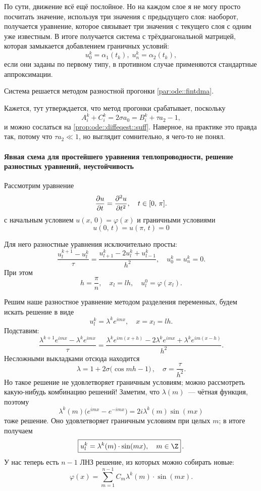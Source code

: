 \documentclass{trlnotes}
\begin{document}
    По сути, движение всё ещё послойное. Но на каждом слое я не могу просто посчитать значение, используя три значения с предыдущего слоя: наоборот, получается уравнение, которое связывает три значения с текущего слоя с одним уже известным. В итоге получается система с трёхдиагональной матрицей, которая замыкается добавлением граничных условий:
    \[
        u_0^k = \alpha_1(t_k), \; u_n^k = \alpha_2(t_k),
    \]
    если они заданы по первому типу, в противном случае применяются стандартные аппроксимации. 

    Система решается методом разностной прогонки \ref{par:ode::fintdma}.

    Кажется, тут утверждается, что метод прогонки срабатывает, поскольку
    \[
        A_i^k + C_i^k = 2\sigma a_0 = B_i^k + \tau a_2 - 1,
    \]
    и можно сослаться на \ref{prop:ode::diffeqest::suff}. Наверное, на практике это правда так, потому что $\tau a_2 \ll 1$, но выглядит сомнительно, я чего-то не понял.

    \paragraph{Явная схема для простейшего уравнения теплопроводности, решение разностных уравнений, неустойчивость}

    Рассмотрим уравнение
    \[
        \dfrac{\partial u}{\partial t} = \dfrac{\partial^2 u}{\partial t^2}, \quad t \in [0, \, \pi].
    \]
    с начальным условием $u(x, \, 0) = \varphi(x)$ и граничными условиями
    \[
        u(0, \, t) = u(\pi, \, t) = 0
    \]

    Для него разностные уравнения исключительно просты:
    \[
        \dfrac{u^{k + 1}_l - u^k_l}{\tau} = \dfrac{u^k_{l + 1} - 2u^k_l + u^k_{l-1}}{h^2}, \quad u_0^k = u_n^k = 0.
    \]
    При этом
    \[
        h = \dfrac{\pi}{n}, \quad x_l = lh, \quad u_l^0 = \varphi(x_l).
    \]

    Решим наше разностное уравнение методом разделения переменных, будем искать решение в виде
    \[
        u_l^k = \lambda^k e^{imx}, \quad x = x_l = lh.
    \]
    Подставим:
    \[
        \dfrac{\lambda^{k + 1}e^{imx} - \lambda^{k}e^{imx}}{\tau} = \dfrac{\lambda^k e^{im(x+h)} - 2\lambda^k e^{imx} + \lambda^k e^{im(x-h)}}{h^2}.
    \]
    Несложными выкладками отсюда находится
    \[
        \lambda = 1 + 2\sigma \big(\cos mh - 1\big)\,, \quad \sigma = \dfrac{\tau}{h^2}.
    \]
    Но такое решение не удовлетворяет граничным условиям; можно рассмотреть какую-нибудь комбинацию решений! Заметим, что $\lambda(m)$~--- чётная функция, поэтому 
    \[
        \lambda^k(m) \big(e^{imx} - e^{-imx}\big) = 2i\lambda^k(m)\sin(mx)
    \]
    тоже решение. Оно удовлетворяет граничным условиям при целых $m$; в итоге получаем
    \[
        \boxed{u_l^k = \lambda^k(m) \cdot \sin (mx), \quad m \in \Z}\,.
    \]
    У нас теперь есть $n-1$ ЛНЗ решение, из которых можно собирать новые:
    \[
        \varphi(x) = \sum\limits_{m = 1}^{n - 1} C_m \lambda^k(m) \cdot \sin (mx).
    \]
\end{document}
